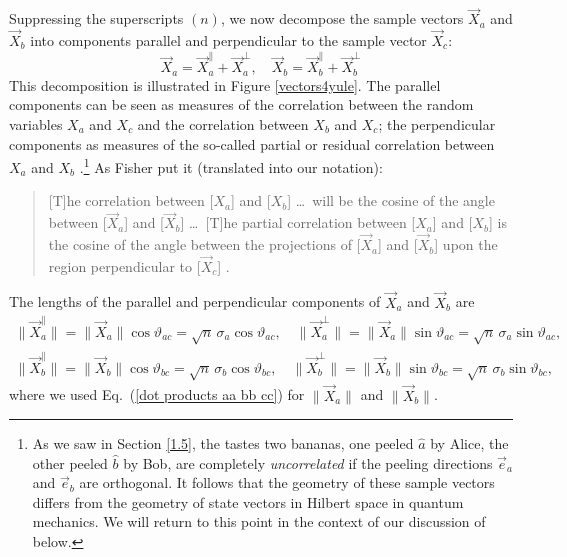 Suppressing the superscripts $(n)$, we now decompose the sample vectors $\vec{X}_a$ and $\vec{X}_b$ into components parallel and perpendicular to the sample vector $\vec{X}_c$:
\begin{equation}
\vec{X}_a = \vec{X}_a^\parallel + \vec{X}_a^\perp, \quad \vec{X}_b = \vec{X}_b^\parallel + \vec{X}_b^\perp
\label{split per par}
\end{equation}
This decomposition is illustrated in Figure \ref{vectors4yule}. The parallel components can be seen as measures of the correlation between the random variables $X_a$ and $X_c$ and the correlation between $X_b$ and $X_c$; the perpendicular components as measures of the so-called partial or residual correlation between $X_a$ and $X_b$ \citep[p.\ 73]{Aldrich 1998}.\footnote{As we saw in Section \ref{1.5}, the tastes two bananas, one peeled $\hat{a}$ by Alice, the other peeled $\hat{b}$ by Bob, are completely \emph{uncorrelated} if the peeling directions $\vec{e}_a$ and $\vec{e}_b$ are orthogonal. It follows that the geometry of these sample vectors differs from the geometry of state vectors in Hilbert space in quantum mechanics. We will return to this point in the context of our discussion of \citet{De Finetti 1937} below.\label{orthogonal preview}} As Fisher put it (translated into our notation): 
\begin{quote}
[T]he correlation between [$X_a$] and [$X_b$] \ldots\ will be the cosine of the angle between  [$\vec{X}_a$] and [$\vec{X}_b$] \ldots\
[T]he partial correlation between [$X_a$] and [$X_b$] is the cosine of the angle between the projections of [$\vec{X}_a$] and [$\vec{X}_b$] upon the region perpendicular to [$\vec{X}_c$]
\citep[pp.\ 329--330]{Fisher 1924}.
\end{quote}
The lengths of the parallel and perpendicular components of $\vec{X}_a$ and $\vec{X}_b$  are
\begin{equation}
\begin{array}{c}
 \| \vec{X}_a^\parallel \| \! = \!  \|  \vec{X}_a  \| \cos{\vartheta_{ac}} \! = \!  \sqrt{n} \, \sigma_a \cos{\vartheta_{ac}}, \quad
\| \vec{X}_a^\perp \| \! = \!  \|  \vec{X}_a  \| \sin{\vartheta_{ac}} \! = \!   \sqrt{n} \, \sigma_a \sin{\vartheta_{ac}},    \\[.4cm]
\| \vec{X}_b^\parallel \| \! = \!  \|  \vec{X}_b  \| \cos{\vartheta_{bc}} \! = \!   \sqrt{n} \, \sigma_b \cos{\vartheta_{bc}}, \quad
\| \vec{X}_b^\perp \| \! = \!  \|  \vec{X}_b  \| \sin{\vartheta_{bc}} \! = \!  \sqrt{n} \, \sigma_b \sin{\vartheta_{bc}}, 
\end{array}
\label{lengths per par}
\end{equation}
where we used Eq.\ (\ref{dot products aa bb cc}) for $ \|  \vec{X}_a  \|$ and $ \|  \vec{X}_b  \|$. 

